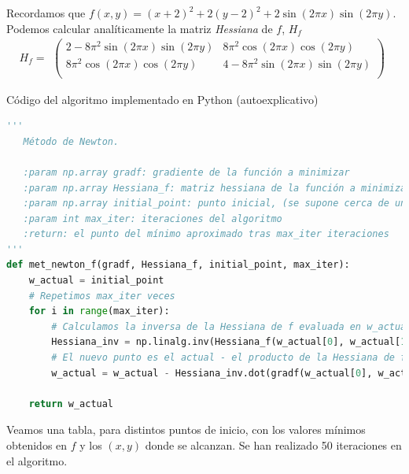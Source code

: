 \documentclass[11pt,a4paper]{article}
\theoremstyle{definition}
\begin{document}
	Recordamos que $f(x,y)=(x+2)^2+2(y-2)^2+2\sin(2\pi x)\sin(2\pi y)$. Podemos calcular analíticamente la matriz \textit{Hessiana} de $f$, $H_f$
	$$H_f=\begin{matrix}
	 \left(\begin{matrix}
	2-8\pi ^2 \sin(2\pi x)\sin(2\pi y) & 8\pi^2\cos(2\pi x)\cos(2\pi y)\\
	8\pi ^2 \cos(2\pi x)\cos(2\pi y) & 4-8\pi ^2\sin(2\pi x)\sin(2\pi y)\\
	\end{matrix}\right)
	\end{matrix}
	$$
	
		Código del algoritmo implementado en Python (autoexplicativo)
	
	\begin{lstlisting}[language=Python, caption= Implementaci\'on del M\'etodo de Newton en Python, inputencoding=latin1]
   '''
   Método de Newton.
   
   :param np.array gradf: gradiente de la función a minimizar
   :param np.array Hessiana_f: matriz hessiana de la función a minimizar
   :param np.array initial_point: punto inicial, (se supone cerca de un mínimo)
   :param int max_iter: iteraciones del algoritmo
   :return: el punto del mínimo aproximado tras max_iter iteraciones
'''
def met_newton_f(gradf, Hessiana_f, initial_point, max_iter):
    w_actual = initial_point
    # Repetimos max_iter veces
    for i in range(max_iter):
        # Calculamos la inversa de la Hessiana de f evaluada en w_actual
        Hessiana_inv = np.linalg.inv(Hessiana_f(w_actual[0], w_actual[1]))
        # El nuevo punto es el actual - el producto de la Hessiana de f evaluada en w_actual por el gradiente de f evaluado en w_actual
        w_actual = w_actual - Hessiana_inv.dot(gradf(w_actual[0], w_actual[1]))
        
    return w_actual    
	\end{lstlisting}
	
	Veamos una tabla, para distintos puntos de inicio, con los valores mínimos obtenidos en $f$ y los $(x,y)$ donde se alcanzan. Se han realizado 50 iteraciones en el algoritmo.
	 
\end{document}
